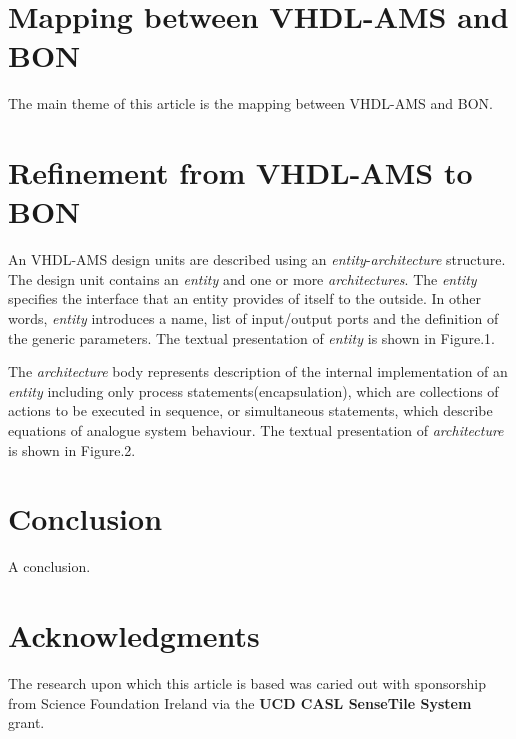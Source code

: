 \documentclass{article}
\newcommand{\ent}{\emph{entity}\xspace}
\newcommand{\arch}{\emph{architecture}\xspace}
\newcommand{\archs}{\emph{architectures}\xspace}
\begin{document}
\section{Mapping between VHDL-AMS and BON}
\label{sec:mappingVB}
The main theme of this article is the mapping between VHDL-AMS and BON.
\section{Refinement from VHDL-AMS to BON }
\label{sec:refVB}
An VHDL-AMS design units are described using an \ent-\arch structure.
The design unit contains an \ent and one or more \archs.
The \ent specifies the interface that an entity provides of itself
to the outside. In other words, \ent introduces a name, list of
input/output ports and the definition of the generic parameters.
The textual presentation of \ent is shown in Figure.1.

 
The \arch body represents description of the internal implementation
of an \ent including only process statements(encapsulation), which
are collections  of actions to be executed in sequence, or simultaneous statements,
which describe equations of analogue system behaviour.
The textual presentation of \arch is shown in Figure.2.


\section{Conclusion}

A conclusion.

\section {Acknowledgments}
The research upon which this article is based was caried out with
sponsorship from Science Foundation Ireland via the
\textbf{UCD CASL SenseTile System} grant.




\end{document}
